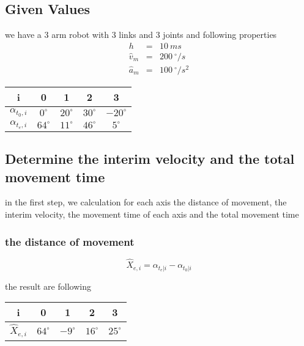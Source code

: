 \documentclass[professionalfonts, 
               xcolor={ usenames, %
                        dvipsnames,%
                        svgnames,%
                        table,%
                        hyperref%
                      }
              ]{beamer}
\begin{document}
\subsection{Given Values }
\begin{frame}
we have a 3 arm robot with 3 links and 3 joints and following properties\\

\begin{eqnarray*}
h & = & 10 ~ms \\
\hat{v}_{m} & = & 200 ~^\circ/s \\
\hat{a}_{m} & = & 100 ~^\circ/s^2
\end{eqnarray*}

\begin{center}
\begin{tabular}{ccccc}
\toprule
i & 0 & 1 & 2 & 3 \\
\midrule
$\alpha_{t_{0},i}$ & $  0^\circ$ & $20^\circ$ & $30^\circ$ & $-20^\circ$ \\ 
$\alpha_{t_{e},i}$ & $ 64^\circ$ & $11^\circ$ & $46^\circ$ & $  5^\circ$ \\
\bottomrule
\end{tabular}
\end{center}
\end{frame}

\subsection{Determine the interim velocity and the total movement time}
\begin{frame}
in the first step, we calculation for each axis the distance of movement, the interim velocity, the movement time of each axis and the total movement time

\subsubsection*{the distance of movement }
\begin{equation*}
\hat{X}_{e,i} = {\alpha_{t_{e}|i} - \alpha_{t_{0}|i}}
\end{equation*}

the result are following    
\begin{center}
\begin{tabular}{ccccc}
\toprule
i & 0 & 1 & 2 & 3 \\
\midrule
$\hat{X}_{e,i}$ & $ 64^\circ$ & $ -9^\circ$ & $16^\circ$ & $25^\circ$ \\
\bottomrule 
\end{tabular}
\end{center}
\end{frame}
\end{document}
